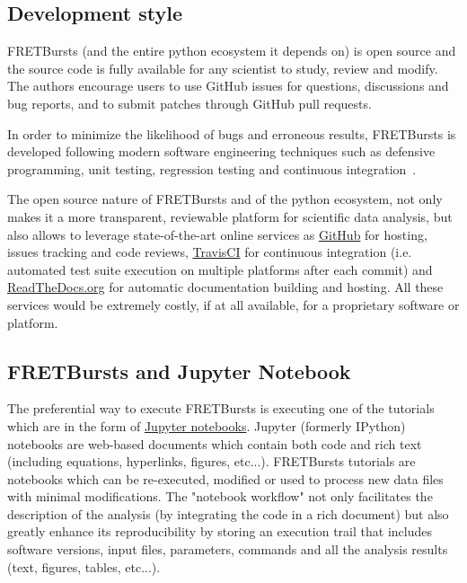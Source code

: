 \subsection{Development style}

FRETBursts (and the entire python ecosystem it depends on) is open source
and the source code is fully available for any scientist to study,
review and modify.
The authors encourage users to use GitHub issues for questions, discussions
and bug reports, and to submit patches through GitHub pull requests.

In order to minimize the likelihood of bugs and erroneous results, FRETBursts is developed
following modern software engineering techniques such
as defensive programming, unit testing, regression testing and continuous integration~\cite{Wilson_2014}.

The open source nature of FRETBursts and of the python ecosystem,
not only makes it a more transparent, reviewable platform
for scientific data analysis, but also allows
to leverage state-of-the-art online services as \href{http://https://github.com}{GitHub} for hosting,
issues tracking and code reviews,
\href{https://travis-ci.org}{TravisCI} for continuous integration
(i.e. automated test suite execution on multiple platforms after each commit)
and \href{https://readthedocs.org/}{ReadTheDocs.org} for automatic documentation building and hosting.
All these services would be extremely costly, if at all available,
for a proprietary software or platform.

\subsection{FRETBursts and Jupyter Notebook}

The preferential way to execute FRETBursts is executing one of the tutorials
which are in the form of \href{http://ipython.org/notebook.html}{Jupyter notebooks}.
Jupyter (formerly IPython) notebooks are web-based documents which contain both
code and rich text (including equations, hyperlinks, figures, etc...).
FRETBursts tutorials are notebooks which can be re-executed,
modified or used to process new data files with minimal modifications.
The "notebook workflow"\cite{Shen_2014} not only facilitates
the description of the analysis (by integrating the code in a rich document)
but also greatly enhance its reproducibility by storing an execution trail
that includes software versions, input files, parameters, commands and all
the analysis results (text, figures, tables, etc...).

